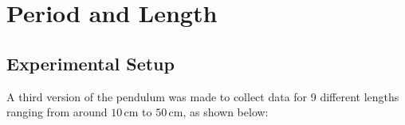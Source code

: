 \documentclass[12pt]{article}
\begin{document}

{\color{blue}

\section{Period and Length} \label{Period and Length}

\subsection{Experimental Setup}
A third version of the pendulum was made to collect data for 9 different lengths ranging from around $10\,$cm to $50\,$cm, as shown below:

}
\end{document}

